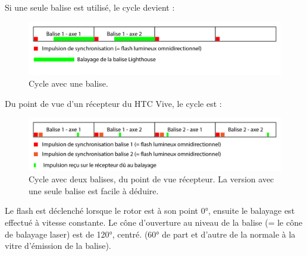 Si une seule balise est utilisé, le cycle devient :

\begin{figure}[H]
\begin{center}
\includegraphics[scale=0.8]{imgs/cycle_balises_lighthouse_une_balise.png}
\end{center}
\caption{Cycle avec une balise.}
\end{figure}

Du point de vue d'un récepteur du HTC Vive, le cycle est :

\begin{figure}[H]
\begin{center}
\includegraphics[scale=0.8]{imgs/cycle_balises_lighthouse_deux_balises_recepteur.png}
\end{center}
\caption{Cycle avec deux balises, du point de vue récepteur. La version avec une seule balise est facile à déduire.}
\end{figure}

Le flash est déclenché lorsque le rotor est à son point 0°, ensuite le balayage est effectué à vitesse constante. Le cône d'ouverture au niveau de la balise (= le cône de balayage laser) est de 120°, centré. (60° de part et d'autre de la normale à la vitre d'émission de la balise).